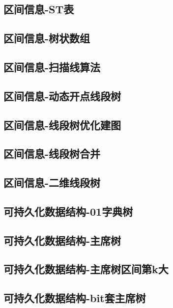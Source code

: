\documentclass[UTF8]{ctexart}
\begin{document}
\begin{CJK}{UTF8}{<font>}
\begin{spacing}{0.80}
\subsection{区间信息-ST表} 
\subsection{区间信息-树状数组} 
\subsection{区间信息-扫描线算法} 
\subsection{区间信息-动态开点线段树} 
\subsection{区间信息-线段树优化建图} 
\subsection{区间信息-线段树合并} 
\subsection{区间信息-二维线段树} 
\subsection{可持久化数据结构-01字典树} 
\subsection{可持久化数据结构-主席树} 
\subsection{可持久化数据结构-主席树区间第k大} 
\subsection{可持久化数据结构-bit套主席树} 

\end{spacing}
\end{CJK}
\end{document}
